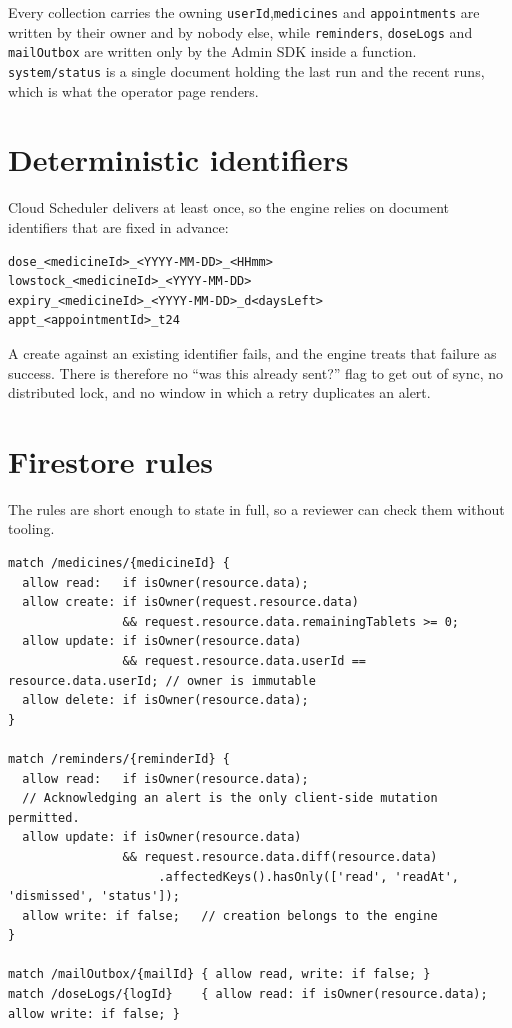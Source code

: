 \documentclass[11pt,a4paper]{report}
\begin{document}
Every collection carries the owning \texttt{userId},\texttt{medicines} and \texttt{appointments} are
written by their owner and by nobody else, while \texttt{reminders}, \texttt{doseLogs} and
\texttt{mailOutbox} are written only by the Admin SDK inside a function. \texttt{system/status} is a
single document holding the last run and the recent runs, which is what the operator page renders.

\section{Deterministic identifiers}

Cloud Scheduler delivers at least once, so the engine relies on document identifiers that are fixed in
advance:

\begin{lstlisting}[caption={Reminder identifier formats.},label={lst:ids}]
dose_<medicineId>_<YYYY-MM-DD>_<HHmm>
lowstock_<medicineId>_<YYYY-MM-DD>
expiry_<medicineId>_<YYYY-MM-DD>_d<daysLeft>
appt_<appointmentId>_t24
\end{lstlisting}

A create against an existing identifier fails, and the engine treats that failure as success. There is
therefore no ``was this already sent?'' flag to get out of sync, no distributed lock, and no window in
which a retry duplicates an alert.

\section{Firestore rules}

The rules are short enough to state in full, so a reviewer can check them without tooling.

\begin{lstlisting}[caption={Firestore rules (abridged, \texttt{firestore.rules}).},label={lst:rules}]
match /medicines/{medicineId} {
  allow read:   if isOwner(resource.data);
  allow create: if isOwner(request.resource.data)
                && request.resource.data.remainingTablets >= 0;
  allow update: if isOwner(resource.data)
                && request.resource.data.userId == resource.data.userId; // owner is immutable
  allow delete: if isOwner(resource.data);
}

match /reminders/{reminderId} {
  allow read:   if isOwner(resource.data);
  // Acknowledging an alert is the only client-side mutation permitted.
  allow update: if isOwner(resource.data)
                && request.resource.data.diff(resource.data)
                     .affectedKeys().hasOnly(['read', 'readAt', 'dismissed', 'status']);
  allow write: if false;   // creation belongs to the engine
}

match /mailOutbox/{mailId} { allow read, write: if false; }
match /doseLogs/{logId}    { allow read: if isOwner(resource.data); allow write: if false; }
\end{lstlisting}
\end{document}
